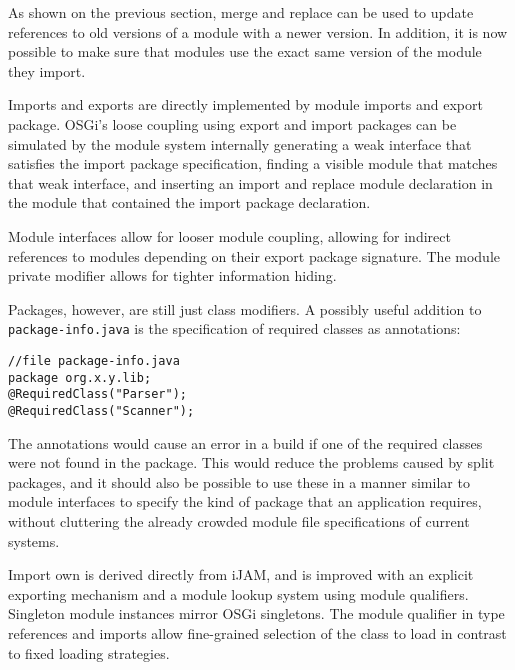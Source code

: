 As shown on the previous section, merge and replace can be used to 
update references to old versions of a module with a newer version.
In addition, it is now possible to make sure that modules use
the exact same version of the module they import.


Imports and exports are directly implemented by module imports and export package.
OSGi's loose coupling using export and import packages can be simulated by
the module system internally generating a weak interface that satisfies the import
package specification, finding a visible module that matches that weak interface, and
inserting an import and replace module declaration in the module that contained the import package
declaration.

Module interfaces allow for looser module coupling, allowing for indirect 
references to modules depending on their export package signature. The module private
modifier allows for tighter information hiding.

Packages, however, are still just class modifiers. A possibly useful addition to 
\texttt{package-info.java} is the specification of required classes as annotations:

\begin{lstlisting}
//file package-info.java
package org.x.y.lib;
@RequiredClass("Parser");
@RequiredClass("Scanner");
\end{lstlisting}

The annotations would cause an error in a build if one of the required classes were not
found in the package. This would reduce the problems caused by split packages, and it should
also be possible to use these in a manner similar to module interfaces to specify the kind
of package that an application requires, without cluttering the already crowded module
file specifications of current systems. 


Import own is derived directly from iJAM, and is improved with an explicit exporting 
mechanism and a module lookup system using module qualifiers. Singleton module instances mirror
OSGi singletons. The module qualifier in type references and
imports allow fine-grained selection of the class to load in contrast
to fixed loading strategies. 